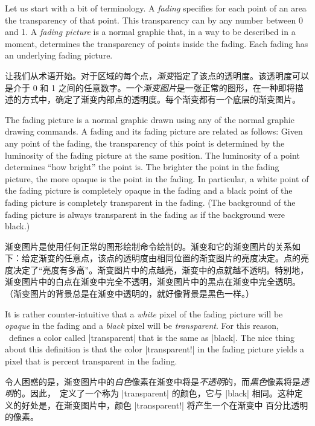 Let us start with a bit of terminology. A \emph{fading} specifies for each
point of an area the transparency of that point. This transparency can by any
number between 0 and 1. A \emph{fading picture} is a normal graphic that, in a
way to be described in a moment, determines the transparency of points inside
the fading. Each fading has an underlying fading picture.

让我们从术语开始。对于区域的每个点，\emph{渐变}指定了该点的透明度。该透明度可以是介于 0 和 1 之间的任意数字。一个\emph{渐变图片}是一张正常的图形，在一种即将描述的方式中，确定了渐变内部点的透明度。每个渐变都有一个底层的渐变图片。

The fading picture is a normal graphic drawn using any of the normal graphic
drawing commands. A fading and its fading picture are related as follows: Given
any point of the fading, the transparency of this point is determined by the
luminosity of the fading picture at the same position. The luminosity of a
point determines ``how bright'' the point is. The brighter the point in the
fading picture, the more opaque is the point in the fading. In particular, a
white point of the fading picture is completely opaque in the fading and a
black point of the fading picture is completely transparent in the fading. (The
background of the fading picture is always transparent in the fading as if the
background were black.)

渐变图片是使用任何正常的图形绘制命令绘制的。渐变和它的渐变图片的关系如下：给定渐变的任意点，该点的透明度由相同位置的渐变图片的亮度决定。点的亮度决定了“亮度有多高”。渐变图片中的点越亮，渐变中的点就越不透明。特别地，渐变图片中的白点在渐变中完全不透明，渐变图片中的黑点在渐变中完全透明。（渐变图片的背景总是在渐变中透明的，就好像背景是黑色一样。）

It is rather counter-intuitive that a \emph{white} pixel of the fading picture
will be \emph{opaque} in the fading and a \emph{black} pixel will be
\emph{transparent}. For this reason, \tikzname\ defines a color called
|transparent| that is the same as |black|. The nice thing about this definition
is that the color |transparent!| in the fading picture yields
a pixel that is  percent transparent in the fading.

令人困惑的是，渐变图片中的\emph{白色}像素在渐变中将是\emph{不透明}的，而\emph{黑色}像素将是\emph{透明}的。因此，\tikzname\ 定义了一个称为 |transparent| 的颜色，它与 |black| 相同。这种定义的好处是，在渐变图片中，颜色 |transparent!| 将产生一个在渐变中  百分比透明的像素。

